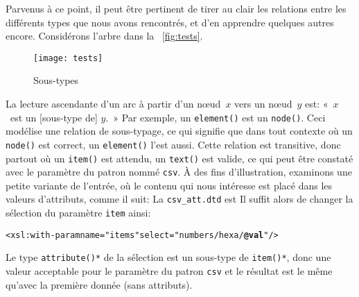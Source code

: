 Parvenus à ce point, il peut être pertinent de tirer au clair les
relations entre les différents types que nous avons rencontrés, et d'en
apprendre quelques autres encore. Considérons l'arbre dans la \fig~\vref{fig:tests}.
\begin{figure}
\texttt{[image: tests]}
\caption{Sous-types \XPath}
\label{fig:tests}
\end{figure}
La lecture ascendante d'un arc à partir d'un nœud~\(x\) vers un
nœud~\(y\) est: «~\(x\)~est un [sous-type de] \(y\).~» Par exemple,
un \texttt{element()} est un \texttt{node()}. Ceci modélise une
relation de sous-typage, ce qui signifie que dans tout contexte où un
\texttt{node()} est correct, un \texttt{element()} l'est aussi. Cette
relation est transitive, donc partout où un \texttt{item()} est
attendu, un \texttt{text()} est valide, ce qui peut être constaté avec
le paramètre du patron nommé \texttt{csv}. À des fins d'illustration,
examinons une petite variante de l'entrée, où le contenu qui nous
intéresse est placé dans les valeurs d'attributs, comme il suit:
\noindent La \DTD \texttt{csv\_att.dtd} est
\noindent Il suffit alors de changer la sélection du paramètre
\texttt{item} ainsi:
\begin{alltt}
\small      <xsl:with-param name="items" select="numbers/hexa/\textbf{@val}"/>
\end{alltt}
Le type \texttt{attribute()*} de la sélection est un sous-type de
\texttt{item()*}, donc une valeur acceptable pour le paramètre du
patron \texttt{csv} et le résultat est le même qu'avec la première
donnée \XML (sans attributs).

